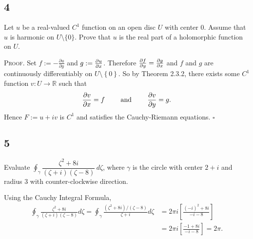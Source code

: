 \documentclass[12pt]{article}
\newcounter{ProofCounter}
\newenvironment{Proof}{\stepcounter{ProofCounter}\textsc{Proof.}}{\hfill$\square$}
\begin{document}
\subsection*{4}
\begin{tcolorbox}
Let $u$ be a real-valued $C^1$ function on an open disc $U$ with center $0$. Assume that $u$ is harmonic on
$U\setminus\{0\}$. Prove that $u$ is the real part of a holomorphic
function on $U$.
\end{tcolorbox}
\begin{Proof}
Set $f := -\frac{\partial u}{\partial y}$ and $g := \frac{\partial u}{\partial x}$. Therefore $\frac{\partial f}{\partial y} = \frac{\partial g}{\partial x}$ and $f$ and $g$
are continuously differentiably on $U \setminus \left\{ 0 \right\}$. So by Theorem 2.3.2, there exists some $C^{1}$ function $v : U \rightarrow
\mathbb{R}$ such that 
\[ \frac{\partial v}{\partial x} = f \qquad \text{ and } \qquad \frac{\partial v}{\partial y} = g. \]
Hence $F := u + iv$ is $C^{1}$ and satisfies the Cauchy-Riemann equations.
\end{Proof}


\subsection*{5}
\begin{tcolorbox}
Evaluate
$\oint_\gamma \dfrac{\zeta^2+8i}{(\zeta+i)(\zeta-8)}\,d\zeta$,
where $\gamma$ is the circle with center $2+ i$ and radius $3$ with
counter-clockwise direction.
\end{tcolorbox}
Using the Cauchy Integral Formula,
\begin{align*}
\oint_{\gamma}\frac{\zeta^2 + 8i}{(\zeta + i)(\zeta - 8)}d\zeta = \oint_{\gamma} \frac{(\zeta^2 + 8i)/(\zeta - 8)}{\zeta + i}d\zeta & = 2\pi i
\left[ \frac{(-i)^2 + 8i}{-i - 8} \right] \\
& = 2\pi i \left[ \frac{-1 + 8i}{-i - 8} \right] = 2\pi.
\end{align*}
\end{document}

